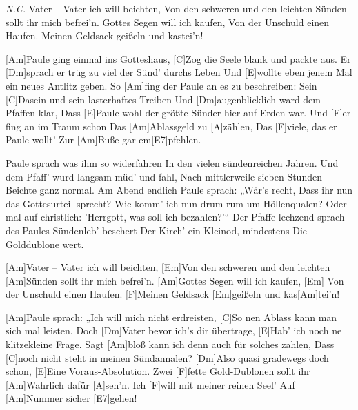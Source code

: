

\begin{guitar}
	 {\footnotesize\textit{N.C.}}
	Vater – Vater ich will beichten,
	Von den schweren und den leichten Sünden sollt ihr mich befrei'n.
	Gottes Segen will ich kaufen,
	Von der Unschuld einen Haufen. Meinen Geldsack geißeln und kastei'n!
	
	[Am]Paule ging einmal ins Gotteshaus,
	[C]Zog die Seele blank und packte aus.
	Er [Dm]sprach er trüg zu viel der Sünd' durchs Leben
	Und [E]wollte eben jenem Mal ein neues Antlitz geben.
	So [Am]fing der Paule an es zu beschreiben:
	Sein [C]Dasein und sein lasterhaftes Treiben
	Und [Dm]augenblicklich ward dem Pfaffen klar,
	Dass [E]Paule wohl der größte Sünder hier auf Erden war.
	Und [F]er fing an im Traum schon
	Das [Am]Ablassgeld zu [A]zählen,
	Das [F]viele, das er Paule wollt'
	Zur [Am]Buße gar em[E7]pfehlen.
	
	Paule sprach was ihm so widerfahren
	In den vielen sündenreichen Jahren.
	Und dem Pfaff' wurd langsam müd' und fahl,
	Nach mittlerweile sieben Stunden Beichte ganz normal.
	Am Abend endlich Paule sprach: „Wär's recht,
	Dass ihr nun das Gottesurteil sprecht?
	Wie komm' ich nun drum rum um Höllenqualen?
	Oder mal auf christlich: 'Herrgott, was soll ich bezahlen?'“
	Der Pfaffe lechzend sprach des Paules 
	Sündenleb' beschert
	Der Kirch' ein Kleinod, mindestens
	Die Golddublone wert.
	
	[Am]Vater – Vater ich will beichten,
	[Em]Von den schweren und den leichten [Am]Sünden sollt ihr mich befrei'n. 
	[Am]Gottes Segen will ich kaufen,
	[Em] Von der Unschuld einen Haufen. [F]Meinen Geldsack [Em]geißeln und kas[Am]tei'n!
	
	[Am]Paule sprach: „Ich will mich nicht erdreisten,
	[C]So nen Ablass kann man sich mal leisten.
	Doch [Dm]Vater bevor ich's dir übertrage,
	[E]Hab' ich noch ne klitzekleine Frage.
	Sagt [Am]bloß kann ich denn auch für solches zahlen,
	Dass [C]noch nicht steht in meinen Sündannalen?
	[Dm]Also quasi gradewegs doch schon,
	[E]Eine Voraus-Absolution.
	Zwei [F]fette Gold-Dublonen sollt ihr 
	[Am]Wahrlich dafür [A]seh'n.
	Ich [F]will mit meiner reinen Seel'
	Auf [Am]Nummer sicher [E7]gehen!
	

\end{guitar}
